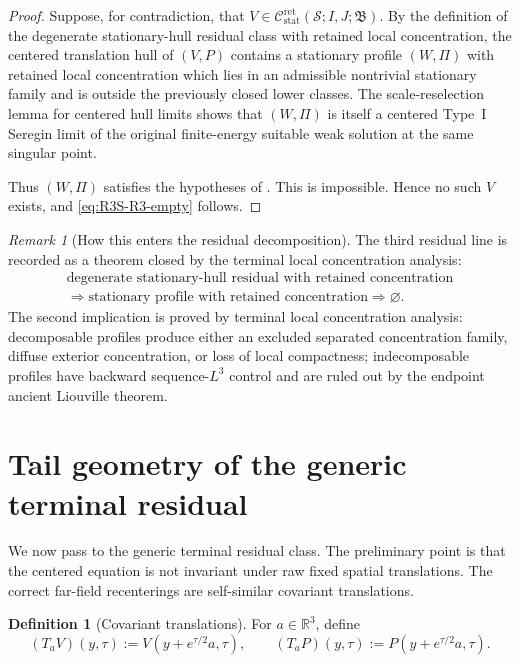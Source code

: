 \documentclass[11pt]{amsart}
\numberwithin{equation}{section}
\theoremstyle{plain}
\theoremstyle{definition}
\newtheorem{definition}[theorem]{Definition}
\theoremstyle{remark}
\newtheorem{remark}[theorem]{Remark}
\newcommand{\R}{\mathbb R}
\newcommand{\Cstat}{\mathcal C_{\mathrm{stat}}^{\mathrm{ret}}}
\begin{document}
\begin{proof}
Suppose, for contradiction, that
\(V\in\Cstat(\mathcal S;I,J;\mathfrak B)\).  By the
definition of the degenerate stationary-hull residual class with retained local
concentration, the centered translation hull of \((V,P)\) contains a stationary
profile \((W,\Pi)\) with retained local concentration
which lies in an admissible nontrivial stationary family and is outside the
previously closed lower classes.  The scale-reselection lemma for centered hull
limits shows that \((W,\Pi)\) is itself a centered Type~I Seregin limit of the
original finite-energy suitable weak solution at the same singular point.

Thus \((W,\Pi)\) satisfies the hypotheses of
.  This is impossible.  Hence no such
\(V\) exists, and \eqref{eq:R3S-R3-empty} follows.
\end{proof}

\begin{remark}[How this enters the residual decomposition]
\label{rem:R3S-decomposition}
The third residual line is recorded as a theorem closed by the terminal
local concentration analysis:
\[
\begin{gathered}
   \text{degenerate stationary-hull residual with retained concentration}\\
   \Longrightarrow
   \text{stationary profile with retained concentration}
   \Longrightarrow
   \varnothing .
\end{gathered}
\]
The second implication is proved by terminal local concentration analysis:
decomposable profiles produce either an excluded separated concentration
family, diffuse exterior concentration, or loss of local compactness;
indecomposable profiles have backward sequence-\(L^3\) control and are ruled
out by the endpoint ancient Liouville theorem.
\end{remark}


\section{Tail geometry of the generic terminal residual}
\label{sec:R4-tail-geometry}

We now pass to the generic terminal residual class.  The preliminary point is that
the centered equation is not invariant under raw fixed spatial translations.
The correct far-field recenterings are self-similar covariant translations.

\begin{definition}[Covariant translations]
\label{def:covariant-translations}
For \(a\in\R^3\), define
\[
   (T_aV)(y,\tau):=V(y+e^{\tau/2}a,\tau),
   \qquad
   (T_aP)(y,\tau):=P(y+e^{\tau/2}a,\tau).
\]
\end{definition}
\end{document}
